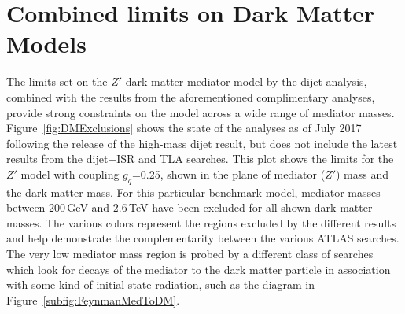 \section{Combined limits on Dark Matter Models}

The limits set on the $Z'$ dark matter mediator model by the dijet analysis, combined with the results from the aforementioned complimentary analyses, provide strong constraints on the model across a wide range of mediator masses.  Figure~\ref{fig:DMExclusions} shows the state of the analyses as of July 2017 following the release of the high-mass dijet result, but does not include the latest results from the dijet+ISR and TLA searches.  This  plot shows the limits for the $Z'$ model with coupling $g_q$=0.25, shown in the plane of mediator ($Z'$) mass and the dark matter mass.  For this particular benchmark model, mediator masses between 200\,GeV and 2.6\,TeV have been excluded for all shown dark matter masses.  The various colors represent the regions excluded by the different results and help demonstrate the complementarity between the various ATLAS searches.  The very low mediator mass region is probed by a different class of searches which look for decays of the mediator to the dark matter particle in association with some kind of initial state radiation, such as the diagram in Figure~\ref{subfig:FeynmanMedToDM}.

